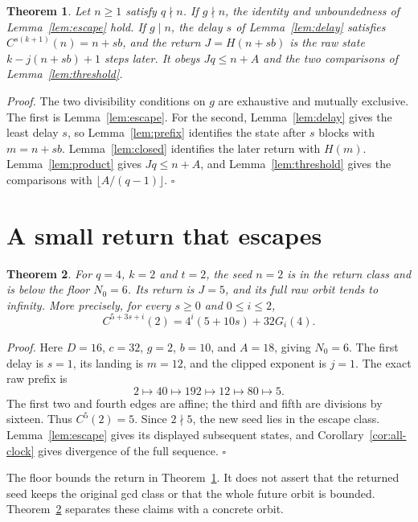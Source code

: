 \documentclass[11pt,letterpaper]{article}
\newtheorem{theorem}{Theorem}
\newenvironment{proof}{\noindent\textit{Proof.}}{\hfill\(\square\)}
\begin{document}
\begin{theorem}
\label{thm:separation}
Let \(n\ge 1\) satisfy \(q\nmid n\). If \(g\nmid n\), the identity and unboundedness of Lemma~\ref{lem:escape} hold. If \(g\mid n\), the delay \(s\) of Lemma~\ref{lem:delay} satisfies \(C^{s(k+1)}(n)=n+sb\), and the return \(J=H(n+sb)\) is the raw state \(k-j(n+sb)+1\) steps later. It obeys \(Jq\le n+A\) and the two comparisons of Lemma~\ref{lem:threshold}.
\end{theorem}

\begin{proof}
The two divisibility conditions on \(g\) are exhaustive and mutually exclusive. The first is Lemma~\ref{lem:escape}. For the second, Lemma~\ref{lem:delay} gives the least delay \(s\), so Lemma~\ref{lem:prefix} identifies the state after \(s\) blocks with \(m=n+sb\). Lemma~\ref{lem:closed} identifies the later return with \(H(m)\). Lemma~\ref{lem:product} gives \(Jq\le n+A\), and Lemma~\ref{lem:threshold} gives the comparisons with \(\lfloor A/(q-1)\rfloor\).
\end{proof}

\section{A small return that escapes}

\begin{theorem}
\label{thm:class-change}
For \(q=4\), \(k=2\) and \(t=2\), the seed \(n=2\) is in the return class
and is below the floor \(N_0=6\). Its return is \(J=5\), and its full raw
orbit tends to infinity. More precisely, for every \(s\ge0\) and \(0\le i\le2\),
\[
C^{5+3s+i}(2)=4^i(5+10s)+32G_i(4).
\]
\end{theorem}

\begin{proof}
Here \(D=16\), \(c=32\), \(g=2\), \(b=10\), and \(A=18\), giving \(N_0=6\).
The first delay is \(s=1\), its landing is \(m=12\), and the clipped exponent
is \(j=1\). The exact raw prefix is
\[
2\longmapsto40\longmapsto192\longmapsto12\longmapsto80\longmapsto5.
\]
The first two and fourth edges are affine; the third and fifth are divisions
by sixteen. Thus \(C^5(2)=5\). Since \(2\nmid5\), the new seed lies in the
escape class. Lemma~\ref{lem:escape} gives its displayed subsequent states,
and Corollary~\ref{cor:all-clock} gives divergence of the full sequence.
\end{proof}

The floor bounds the return in Theorem~\ref{thm:separation}. It does not
assert that the returned seed keeps the original gcd class or that the whole
future orbit is bounded. Theorem~\ref{thm:class-change} separates these claims
with a concrete orbit.
\end{document}
